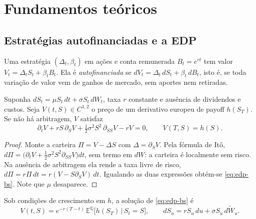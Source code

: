\section{Fundamentos teóricos}

\subsection{Estratégias autofinanciadas e a EDP}

\begin{definicao}
Uma estratégia $(\Delta_t,\beta_t)$ em ações e conta remunerada $B_t=e^{rt}$ tem valor $V_t=\Delta_tS_t+\beta_tB_t$. Ela é \emph{autofinanciada} se $dV_t=\Delta_t\,dS_t+\beta_t\,dB_t$, isto é, se toda variação de valor vem de ganhos de mercado, sem aportes nem retiradas.
\end{definicao}

\begin{teorema}\label{teo:bsm}
Suponha $dS_t=\mu S_t\,dt+\sigma S_t\,dW_t$, taxa $r$ constante e ausência de dividendos e custos. Seja $V(t,S)\in C^{1,2}$ o preço de um derivativo europeu de payoff $h(S_T)$. Se não há arbitragem, $V$ satisfaz
\begin{equation}\label{eq:edp-bs}
\partial_tV+rS\,\partial_SV+\tfrac12\sigma^2S^2\,\partial_{SS}V-rV=0,\qquad V(T,S)=h(S).
\end{equation}
\end{teorema}

\begin{proof}
Monte a carteira $\Pi=V-\Delta S$ com $\Delta=\partial_SV$. Pela fórmula de Itô,
$d\Pi=\big(\partial_tV+\tfrac12\sigma^2S^2\partial_{SS}V\big)dt$, sem termo em $dW$: a carteira é localmente sem risco. Na ausência de arbitragem ela rende a taxa livre de risco, $d\Pi=r\Pi\,dt=r(V-S\partial_SV)\,dt$. Igualando as duas expressões obtém-se \eqref{eq:edp-bs}. Note que $\mu$ desaparece.
\end{proof}

\begin{teorema}\label{teo:fk}
Sob condições de crescimento em $h$, a solução de \eqref{eq:edp-bs} é
\begin{equation}
V(t,S)=e^{-r(T-t)}\,\mathbb E^{\mathbb Q}\big[h(S_T)\,\big|\,S_t=S\big],\qquad dS_u=rS_u\,du+\sigma S_u\,d\widetilde W_u.
\end{equation}
\end{teorema}

